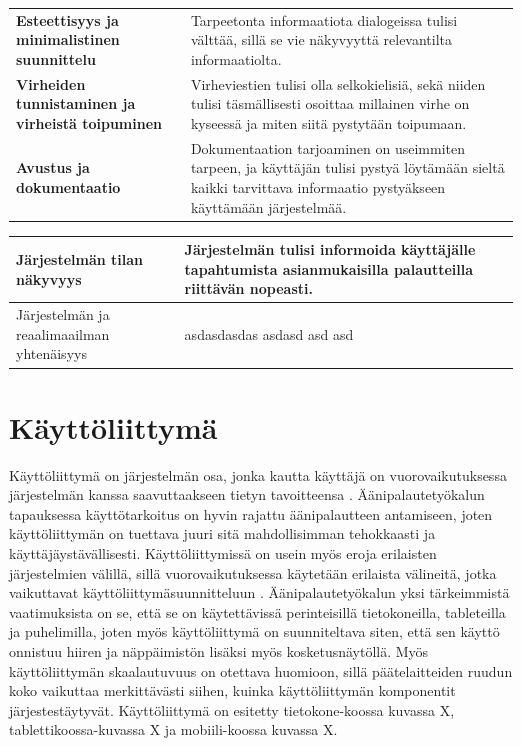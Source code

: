 \documentclass[utf8]{gradu3}
\begin{document}
\begin{table}[htbp]
\begin{tabular}{p{12.355em}p{21.855em}}
    \textbf{Esteettisyys ja minimalistinen suunnittelu} & Tarpeetonta informaatiota dialogeissa tulisi välttää, sillä se vie näkyvyyttä relevantilta informaatiolta. \\
    \textbf{Virheiden tunnistaminen ja virheistä toipuminen} & Virheviestien tulisi olla selkokielisiä, sekä niiden tulisi täsmällisesti osoittaa millainen virhe on kyseessä ja miten siitä pystytään toipumaan. \\
    \textbf{Avustus ja dokumentaatio} & Dokumentaation tarjoaminen on useimmiten tarpeen, ja käyttäjän tulisi pystyä löytämään sieltä kaikki tarvittava informaatio pystyäkseen käyttämään järjestelmää. \\
    \end{tabular}%
  \label{tab:addlabel}%
\end{table}%

\begin{center}
\begin{tabular}[t]{|p{5cm}|p{5cm}|}
    \hline
    Järjestelmän tilan näkyvyys  & Järjestelmän tulisi informoida käyttäjälle tapahtumista asianmukaisilla palautteilla riittävän nopeasti. \\
    \hline
	Järjestelmän ja reaalimaailman yhtenäisyys  & asdasdasdas asdasd asd asd \\
    \hline
\end{tabular}
\end{center}


\section{Käyttöliittymä}

Käyttöliittymä on järjestelmän osa, jonka kautta käyttäjä on vuorovaikutuksessa järjestelmän kanssa saavuttaakseen tietyn tavoitteensa \parencite[][]{stone}. Äänipalautetyökalun tapauksessa käyttötarkoitus on hyvin rajattu äänipalautteen antamiseen, joten käyttöliittymän on tuettava juuri sitä mahdollisimman tehokkaasti ja käyttäjäystävällisesti.  Käyttöliittymissä on usein myös eroja erilaisten järjestelmien välillä, sillä vuorovaikutuksessa käytetään erilaista välineitä, jotka vaikuttavat käyttöliittymäsuunnitteluun \parencite[][]{stone}. Äänipalautetyökalun yksi tärkeimmistä vaatimuksista on se, että se on käytettävissä perinteisillä tietokoneilla, tableteilla ja puhelimilla, joten myös käyttöliittymä on suunniteltava siten, että sen käyttö onnistuu hiiren ja näppäimistön lisäksi myös kosketusnäytöllä. Myös käyttöliittymän skaalautuvuus on otettava huomioon, sillä päätelaitteiden ruudun koko vaikuttaa merkittävästi siihen, kuinka käyttöliittymän komponentit järjestestäytyvät. Käyttöliittymä on esitetty tietokone-koossa kuvassa X, tablettikoossa-kuvassa X ja mobiili-koossa kuvassa X.
\end{document}
